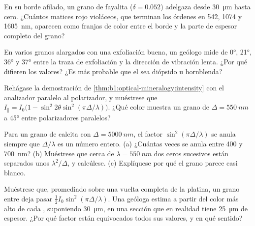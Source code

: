 \begin{exercise}[$\star\star$]\label{exo:b1:optical-mineralogy:8}
En su borde afilado, un grano de fayalita ($\delta = 0.052$) adelgaza desde \qty{30}{\micro m} hasta cero. ¿Cuántos matices
rojo violáceos, que terminan los órdenes en 542, 1074 y \qty{1605}{nm}, aparecen como franjas de color entre el borde y la
parte de espesor completo del grano?
\end{exercise}

\begin{exercise}[$\star\star$]\label{exo:b1:optical-mineralogy:9}
En varios granos alargados con una exfoliación buena, un geólogo mide  de \ang{0}, \ang{21}, \ang{36} y
\ang{37} entre la traza de exfoliación y la dirección de vibración lenta. ¿Por qué difieren los valores? ¿Es más probable
que el  sea diópsido u hornblenda?
\end{exercise}

\begin{exercise}[$\star\star\star$]\label{exo:b1:optical-mineralogy:10}
Rehágase la demostración de \cref{thm:b1:optical-mineralogy:intensity} con el analizador paralelo al polarizador, y muéstrese que
$I_\parallel = I_0\bigl(1 - \sin^2 2\theta\sin^2(\pi\Delta/\lambda)\bigr)$. ¿Qué color muestra un grano de $\Delta = \qty{550}{nm}$
a \ang{45} entre polarizadores paralelos?
\end{exercise}

\begin{exercise}[$\star\star\star$]\label{exo:b1:optical-mineralogy:11}
Para un grano de calcita con $\Delta = \qty{5000}{nm}$, el factor $\sin^2(\pi\Delta/\lambda)$ se anula siempre que $\Delta/\lambda$
es un número entero. (a) ¿Cuántas veces se anula entre \num{400} y \qty{700}{nm}? (b) Muéstrese que cerca de
$\lambda = \qty{550}{nm}$ dos ceros sucesivos están separados unos $\lambda^2/\Delta$, y calcúlese. (c) Explíquese por qué
el grano parece casi blanco.
\end{exercise}

\begin{exercise}[$\star\star\star$]\label{exo:b1:optical-mineralogy:12}
Muéstrese que, promediado sobre una vuelta completa de la platina, un grano entre  deja pasar
$\frac12 I_0\sin^2(\pi\Delta/\lambda)$. Una geóloga estima  a partir del color más alto de cada ,
suponiendo \qty{30}{\micro m}, en una sección que en realidad tiene \qty{25}{\micro m} de espesor. ¿Por qué factor están
equivocados todos sus valores, y en qué sentido?
\end{exercise}

